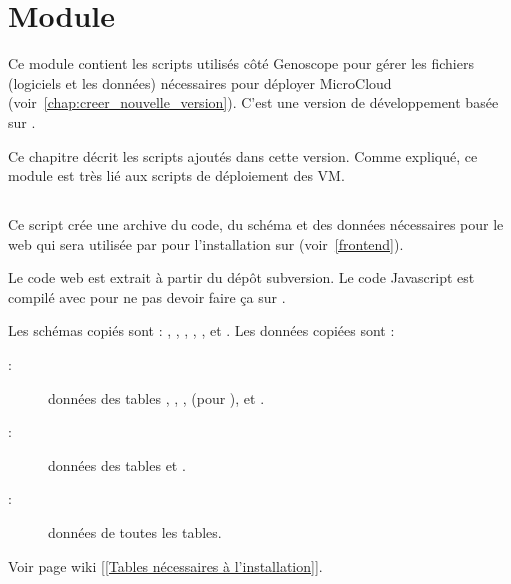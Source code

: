 \chapter{Module \micWEBdeployVer} \label{chap:micwebdeploy}

Ce module contient les scripts utilisés côté Genoscope pour gérer les fichiers (logiciels et les données) nécessaires pour déployer MicroCloud (voir~\autoref{chap:creer_nouvelle_version}).
C'est une version de développement basée sur .

Ce chapitre décrit les scripts ajoutés dans cette version.
Comme expliqué, ce module est très lié aux scripts de déploiement des VM.

\section{}

Ce script crée une archive du code, du schéma et des données nécessaires pour le web
qui sera utilisée par  pour l'installation sur  (voir~\autoref{frontend}).

Le code web est extrait à partir du dépôt subversion.
Le code Javascript est compilé avec  pour ne pas devoir faire ça sur .

Les schémas copiés sont : , , , , ,  et .
Les données copiées sont :
\begin{description}
    \item[:] données des tables , , ,  (pour ),
     et .
    \item[:] données des tables  et .
    \item[:] données de toutes les tables.
\end{description}

Voir page wiki \href{https://intranet.genoscope.cns.fr/agc/redmine/projects/microcloud/wiki/Tables_necessaires_a_installation}{[[Tables nécessaires à l'installation]]}.

\section{}

